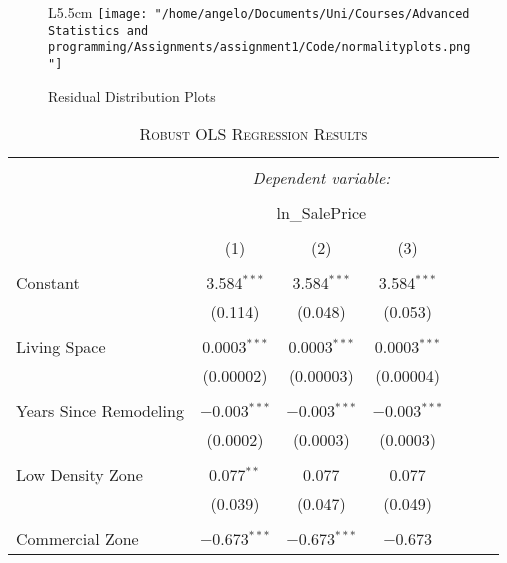 \documentclass[a4paper]{article}
\begin{document}

\begin{figure}{L}{5.5cm}
		\centering
         \texttt{[image: "/home/angelo/Documents/Uni/Courses/Advanced Statistics and programming/Assignments/assignment1/Code/normalityplots.png"]}
         \small
         \caption{Residual Distribution Plots}


\end{figure}

\begin{table}[!htbp] \centering 
\begin{adjustwidth}{0.5cm}{-0cm}
\begin{threeparttable}
\small
\captionsetup{font=small, justification=raggedright,singlelinecheck=false}
\caption{\textsc{Robust OLS Regression Results}}
\centering 
  \label{}
\small 
\begin{tabular}{@{\extracolsep{-7pt}}lcccccc} 
\\[-5.8ex]\hline 
\hline \\[-1.8ex] 
 & \multicolumn{3}{c}{\textit{Dependent variable:}} \\ 
\cline{2-4} 
\\[-1.8ex] & \multicolumn{3}{c}{ln\_SalePrice} \\ 
\\[-1.8ex] & (1) & (2) & (3)\\ 
\hline \\[-1.8ex] 
 Constant & 3.584$^{***}$ & 3.584$^{***}$ & 3.584$^{***}$ \\ 
  & (0.114) & (0.048) & (0.053) \\ 
  & & & \\ 
 Living Space &  0.0003$^{***}$ & 0.0003$^{***}$ & 0.0003$^{***}$ \\ 
  & (0.00002) & (0.00003) & (0.00004) \\ 
  & & & \\ 
 Years Since Remodeling & $-$0.003$^{***}$ & $-$0.003$^{***}$ & $-$0.003$^{***}$ \\ 
  & (0.0002) & (0.0003) & (0.0003) \\ 
  & & & \\ 
 Low Density Zone & 0.077$^{**}$ & 0.077 & 0.077 \\ 
  & (0.039) & (0.047) & (0.049) \\ 
  & & & \\ 
 Commercial Zone & $-$0.673$^{***}$ & $-$0.673$^{***}$ & $-$0.673 \\ 

\end{tabular}
\end{threeparttable}
\end{adjustwidth}
\end{table}
\end{document}
